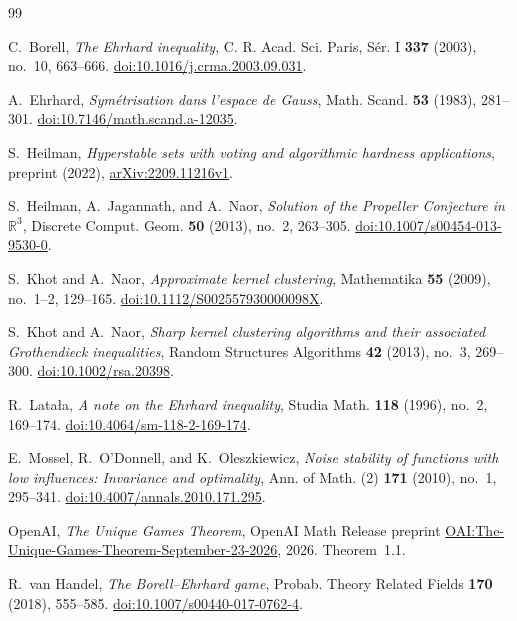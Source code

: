 \begin{thebibliography}{99}

C.~Borell,
\emph{The Ehrhard inequality},
C. R. Acad. Sci. Paris, S\'er. I \textbf{337} (2003), no.~10, 663--666.
\href{https://doi.org/10.1016/j.crma.2003.09.031}{doi:10.1016/j.crma.2003.09.031}.

A.~Ehrhard,
\emph{Sym\'etrisation dans l'espace de Gauss},
Math. Scand. \textbf{53} (1983), 281--301.
\href{https://doi.org/10.7146/math.scand.a-12035}{doi:10.7146/math.scand.a-12035}.

S.~Heilman,
\emph{Hyperstable sets with voting and algorithmic hardness applications},
preprint (2022),
\href{https://arxiv.org/abs/2209.11216v1}{arXiv:2209.11216v1}.

S.~Heilman, A.~Jagannath, and A.~Naor,
\emph{Solution of the Propeller Conjecture in $\mathbb R^3$},
Discrete Comput. Geom. \textbf{50} (2013), no.~2, 263--305.
\href{https://doi.org/10.1007/s00454-013-9530-0}{doi:10.1007/s00454-013-9530-0}.

S.~Khot and A.~Naor,
\emph{Approximate kernel clustering},
Mathematika \textbf{55} (2009), no.~1--2, 129--165.
\href{https://doi.org/10.1112/S002557930000098X}{doi:10.1112/S002557930000098X}.

S.~Khot and A.~Naor,
\emph{Sharp kernel clustering algorithms and their associated
Grothendieck inequalities},
Random Structures Algorithms \textbf{42} (2013), no.~3, 269--300.
\href{https://doi.org/10.1002/rsa.20398}{doi:10.1002/rsa.20398}.

R.~Lata\l a,
\emph{A note on the Ehrhard inequality},
Studia Math. \textbf{118} (1996), no.~2, 169--174.
\href{https://doi.org/10.4064/sm-118-2-169-174}{doi:10.4064/sm-118-2-169-174}.

E.~Mossel, R.~O'Donnell, and K.~Oleszkiewicz,
\emph{Noise stability of functions with low influences:
Invariance and optimality},
Ann. of Math. (2) \textbf{171} (2010), no.~1, 295--341.
\href{https://doi.org/10.4007/annals.2010.171.295}{doi:10.4007/annals.2010.171.295}.

OpenAI,
\emph{The Unique Games Theorem},
OpenAI Math Release preprint
\href{https://github.com/openai/math/blob/main/preprints/The-Unique-Games-Theorem-September-23-2026/paper.pdf}{OAI:The-Unique-Games-Theorem-September-23-2026},
2026.
Theorem~1.1.

R.~van Handel,
\emph{The Borell--Ehrhard game},
Probab. Theory Related Fields \textbf{170} (2018), 555--585.
\href{https://doi.org/10.1007/s00440-017-0762-4}{doi:10.1007/s00440-017-0762-4}.

\end{thebibliography}
